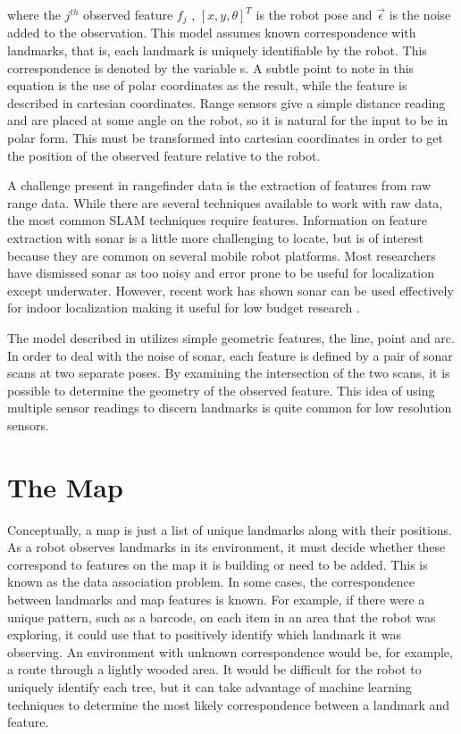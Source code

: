 \documentclass[12pt]{article}
\begin{document}
where the $j^{th}$ observed feature $f_j$ , $[x,y,\theta ]^T$ is the robot pose and $\vec{\epsilon}$ is the noise added to the observation.  This model assumes known correspondence with landmarks, that is, each landmark is uniquely identifiable by the robot.  This correspondence is denoted by the variable s.  A subtle point to note in this equation is the use of polar coordinates as the result, while the feature is described in cartesian coordinates.  Range sensors give a simple distance reading and are placed at some angle on the robot, so it is natural for the input to be in polar form.  This must be transformed into cartesian coordinates in order to get the position of the observed feature relative to the robot.  

A challenge present in rangefinder data is the extraction of features from raw range data. While there are several techniques available to work with raw data, the most common SLAM techniques require features.  Information on feature extraction with sonar is a little more challenging to locate, but is of interest because they are common on several mobile robot platforms.  Most researchers have dismissed sonar as too noisy and error prone to be useful for localization except underwater.  However, recent work has shown sonar can be used effectively for indoor localization making it useful for low budget research \cite{lee2007feature}.  

The model described in \cite{lee2007feature} utilizes simple geometric features, the line, point and arc.  In order to deal with the noise of sonar, each feature is defined by a pair of sonar scans at two separate poses.  By examining the intersection of the two scans, it is possible to determine the geometry of the observed feature.  This idea of using multiple sensor readings to discern landmarks is quite common for low resolution sensors.

\section{The Map}

Conceptually, a map is just a list of unique landmarks along with their positions.  As a robot observes landmarks in its environment, it must decide whether these correspond to features on the map it is building or need to be added.  This is known as the data association problem.  In some cases, the correspondence between landmarks and map features is known.  For example, if there were a unique pattern, such as a barcode, on each item in an area that the robot was exploring, it could use that to positively identify which landmark it was observing.  An environment with unknown correspondence would be, for example, a route through a lightly wooded area.  It would be difficult for the robot to uniquely identify each tree, but it can take advantage of machine learning techniques to determine the most likely correspondence between a landmark and feature.
\end{document}
